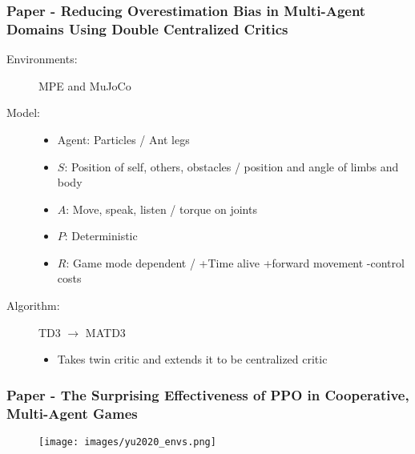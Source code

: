 \documentclass{beamer}
\begin{document}
\begin{frame} %
    \frametitle{Paper \thepapercounter - Reducing Overestimation Bias in Multi-Agent Domains 
    Using Double Centralized Critics}
    \begin{description}
        \item[Environments:] MPE and MuJoCo 
        \item[Model:]
        \begin{itemize}
            \item Agent:  Particles / Ant legs
            \item $S$: Position of self, others, obstacles / position and angle of limbs and body
            \item $A$: Move, speak, listen / torque on joints
            \item $P$: Deterministic
            \item $R$: Game mode dependent / +Time alive +forward movement -control costs
        \end{itemize}
        \item[Algorithm:] TD3 $\rightarrow$ MATD3
        \begin{itemize}
            \item Takes twin critic and extends it to be centralized critic
        \end{itemize}
    \end{description}
\end{frame}

\begin{frame} %
    \frametitle{Paper \thepapercounter - The Surprising Effectiveness of PPO in Cooperative, 
    Multi-Agent Games}
    \begin{description}\small
        \item[Environments:] 
    \end{description}
    \begin{figure}\small\vspace*{-1em}
        \texttt{[image: images/yu2020\_envs.png]}
    \end{figure}
\end{frame}
\end{document}
